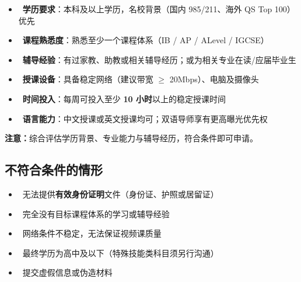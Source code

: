 \documentclass[a4paper,10pt]{article}
\newcommand{\checkyes}{\textcolor{GreenOk}{\ding{51}}}   %
\newcommand{\checkno}{\textcolor{RedErr}{\ding{55}}}      %
\begin{document}
\vspace{4pt}
\begin{tcolorbox}[
  enhanced, colback=GreenLt, colframe=GreenOk,
  boxrule=1pt, arc=6pt,
  left=12pt, right=12pt, top=10pt, bottom=10pt
]
\begin{itemize}[leftmargin=1.2em, itemsep=5pt]
  \item[\checkyes]\ \textbf{学历要求}：本科及以上学历，名校背景（国内 985/211、海外 QS Top 100）优先
  \item[\checkyes]\ \textbf{课程熟悉度}：熟悉至少一个课程体系（IB / AP / ALevel / IGCSE）
  \item[\checkyes]\ \textbf{辅导经验}：有过家教、助教或相关辅导经历；或为相关专业在读/应届毕业生
  \item[\checkyes]\ \textbf{授课设备}：具备稳定网络（建议带宽 $\geq$ 20Mbps）、电脑及摄像头
  \item[\checkyes]\ \textbf{时间投入}：每周可投入至少 \textbf{10 小时}以上的稳定授课时间
  \item[\checkyes]\ \textbf{语言能力}：中文授课或英文授课均可；双语导师享有更高曝光优先权
\end{itemize}
\end{tcolorbox}

\begin{infobox}
\textbf{注意：}综合评估学历背景、专业能力与辅导经历，符合条件即可申请。
\end{infobox}

\subsection{不符合条件的情形}

\begin{tcolorbox}[
  enhanced, colback=RedLt, colframe=RedErr,
  boxrule=1pt, arc=6pt,
  left=12pt, right=12pt, top=10pt, bottom=10pt
]
\begin{itemize}[leftmargin=1.2em, itemsep=5pt]
  \item[\checkno]\ 无法提供\textbf{有效身份证明}文件（身份证、护照或居留证）
  \item[\checkno]\ 完全没有目标课程体系的学习或辅导经验
  \item[\checkno]\ 网络条件不稳定，无法保证视频课质量
  \item[\checkno]\ 最终学历为高中及以下（特殊技能类科目须另行沟通）
  \item[\checkno]\ 提交虚假信息或伪造材料
\end{itemize}
\end{tcolorbox}
\end{document}
